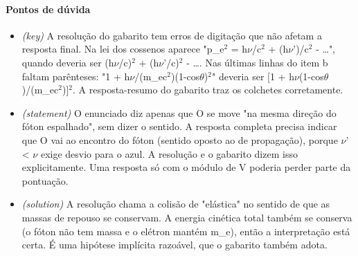 \documentclass{article}%
\begin{document}
\paragraph{Pontos de dúvida}%
\begin{itemize}%
\item%
\textit{(key)} A resolução do gabarito tem erros de digitação que não afetam a resposta final. Na lei dos cossenos aparece "p\_e$^2$ = h$\nu$/c$^2$ + (h$\nu$')/c$^2$ - \ldots{}", quando deveria ser (h$\nu$/c)$^2$ + (h$\nu$'/c)$^2$ - \ldots{}. Nas últimas linhas do item b faltam parênteses: "1 + h$\nu$/(m\_ec$^2$)(1-cos$\theta$)$^2$" deveria ser {[}1 + h$\nu$(1-cos$\theta$)/(m\_ec$^2$){]}$^2$. A resposta{-}resumo do gabarito traz os colchetes corretamente.%
\item%
\textit{(statement)} O enunciado diz apenas que O se move "na mesma direção do fóton espalhado", sem dizer o sentido. A resposta completa precisa indicar que O vai ao encontro do fóton (sentido oposto ao de propagação), porque $\nu$' < $\nu$ exige desvio para o azul. A resolução e o gabarito dizem isso explicitamente. Uma resposta só com o módulo de V poderia perder parte da pontuação.%
\item%
\textit{(solution)} A resolução chama a colisão de "elástica" no sentido de que as massas de repouso se conservam. A energia cinética total também se conserva (o fóton não tem massa e o elétron mantém m\_e), então a interpretação está certa. É uma hipótese implícita razoável, que o gabarito também adota.%
\end{itemize}%
\end{document}
